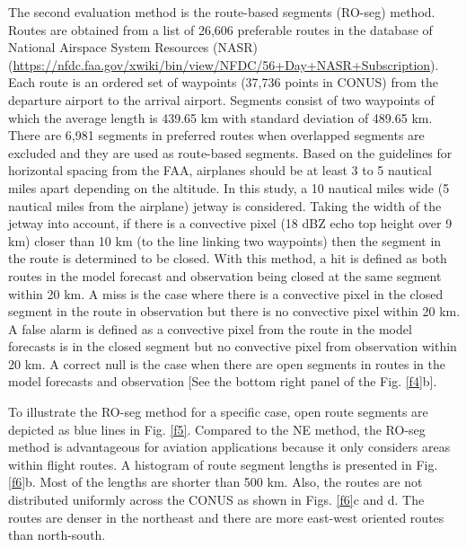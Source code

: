 \documentclass[12pt]{article}
\begin{document}
The second evaluation method is the route-based segments (RO-seg) method. Routes are obtained from a list of 26,606 preferable routes in the database of National Airspace System Resources (NASR)  (\url{https://nfdc.faa.gov/xwiki/bin/view/NFDC/56+Day+NASR+Subscription}). Each route is an ordered set of waypoints (37,736 points in CONUS)  from the departure airport to the arrival airport. Segments consist of two waypoints of which the average length is 439.65 km with standard deviation of 489.65 km. There are 6,981 segments in preferred routes when overlapped segments are excluded and they are used as route-based segments. Based on the guidelines for horizontal spacing from the FAA, airplanes should be at least 3 to 5 nautical miles apart depending on the altitude. In this study, a 10 nautical miles wide (5 nautical miles from the airplane) jetway is considered. Taking the width of the jetway into account, if there is a convective pixel (18 dBZ echo top height over 9 km) closer than 10 km (to the line linking two waypoints) then the segment in the route is determined to be closed. With this method, a hit is defined as both routes in the model forecast and observation being closed at the same segment within 20 km. A miss is the case where there is a convective pixel in the closed segment in the route in observation but there is no convective pixel within 20 km. A false alarm is defined as a convective pixel from the route in the model forecasts is in the closed segment but no convective pixel from observation within 20 km. A correct null is the case when there are open segments in routes in the model forecasts and observation [See the bottom right panel of the Fig. \ref{f4}b].

To illustrate the RO-seg method for a specific case, open route segments are depicted as blue lines in Fig. \ref{f5}. Compared to the NE method, the RO-seg method is advantageous for aviation applications because it only considers areas within flight routes. A histogram of route segment lengths is presented in Fig. \ref{f6}b. Most of the lengths are shorter than 500 km. Also, the routes are not distributed uniformly across the CONUS as shown in Figs. \ref{f6}c and d. The routes are denser in the northeast and there are more east-west oriented routes than north-south.
\end{document}

